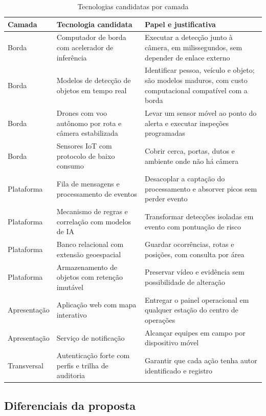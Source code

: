 \documentclass[12pt,a4paper,oneside]{article}
\newcommand{\fonte}[1]{\par\vspace{5pt}{\footnotesize\singlespacing Fonte: #1\par}}
\newcommand{\cab}[1]{\textbf{\footnotesize #1}}
\begin{document}
\begin{table}[H]
\centering
\caption{Tecnologias candidatas por camada}
\label{tab:tecnologias}
{\small\singlespacing
\begin{tabularx}{\textwidth}{L{2.4cm} L{4.2cm} X}
\toprule
\cab{Camada} & \cab{Tecnologia candidata} & \cab{Papel e justificativa} \\
\midrule
Borda & Computador de borda com acelerador de inferência & Executar a detecção
junto à câmera, em milissegundos, sem depender de enlace externo \\
Borda & Modelos de detecção de objetos em tempo real & Identificar pessoa,
veículo e objeto; são modelos maduros, com custo computacional compatível com
a borda \\
Borda & Drones com voo autônomo por rota e câmera estabilizada & Levar um
sensor móvel ao ponto do alerta e executar inspeções programadas \\
Borda & Sensores IoT com protocolo de baixo consumo & Cobrir cerca, portas,
dutos e ambiente onde não há câmera \\
Plataforma & Fila de mensagens e processamento de eventos & Desacoplar a
captação do processamento e absorver picos sem perder evento \\
Plataforma & Mecanismo de regras e correlação com modelos de IA & Transformar
detecções isoladas em evento com pontuação de risco \\
Plataforma & Banco relacional com extensão geoespacial & Guardar ocorrências,
rotas e posições, com consulta por área \\
Plataforma & Armazenamento de objetos com retenção imutável & Preservar vídeo
e evidência sem possibilidade de alteração \\
Apresentação & Aplicação web com mapa interativo & Entregar o painel
operacional em qualquer estação do centro de operações \\
Apresentação & Serviço de notificação & Alcançar equipes em campo por
dispositivo móvel \\
Transversal & Autenticação forte com perfis e trilha de auditoria & Garantir
que cada ação tenha autor identificado e registro \\
\bottomrule
\end{tabularx}}
\fonte{elaborado pelos autores (2026).}
\end{table}

\subsection{Diferenciais da proposta}
\end{document}

